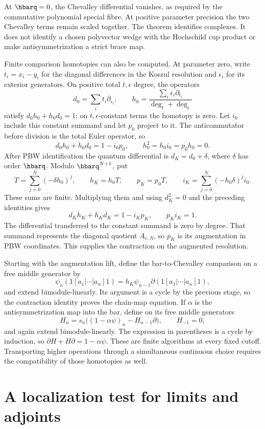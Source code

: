 At $\hbarq=0$, the Chevalley differential vanishes, as required by
the commutative polynomial special fibre. At positive parameter
precision the two Chevalley terms remain scaled together.
The theorem identifies complexes. It does not identify a chosen
polyvector wedge with the Hochschild cup product or make
antisymmetrization a strict brace map.

Finite comparison homotopies can also be computed. At parameter
zero, write $t_i=x_i-y_i$ for the diagonal differences in the
Koszul resolution and $\epsilon_i$ for its exterior generators.
On positive total $t,\epsilon$ degree, the operators
\[
 d_0=\sum_i t_i\partial_{\epsilon_i},\qquad
 h_0=\frac{\sum_i\epsilon_i\partial_{t_i}}
                    {\deg_t+\deg_\epsilon}
\]
satisfy $d_0h_0+h_0d_0=1$; on $t,\epsilon$-constant terms the
homotopy is zero. Let $i_0$ include this constant summand and let
$p_0$ project to it. The anticommutator before division is the
total Euler operator, so
\[
 d_0h_0+h_0d_0=1-i_0p_0,\qquad
 h_0^2=h_0i_0=p_0h_0=0.
\]
After PBW identification the quantum differential is
$d_K=d_0+\delta$, where $\delta$ has order $\hbarq$.
Modulo $\hbarq^{N+1}$, put
\[
 T=\sum_{j=0}^{N}(-\delta h_0)^j,\qquad
 h_K=h_0T,\qquad p_K=p_0T,\qquad
 i_K=\sum_{j=0}^{N}(-h_0\delta)^j i_0.
\]
These sums are finite. Multiplying them and using
$d_K^2=0$ and the preceding identities gives
\[
 d_Kh_K+h_Kd_K=1-i_Kp_K,\qquad p_Ki_K=1.
\]
The differential transferred to the constant summand is zero by
degree. That summand represents the diagonal quotient $A_{e,N}$,
so $p_K$ is its augmentation in PBW coordinates. This supplies
the contraction on the augmented resolution.

Starting with the augmentation lift, define the bar-to-Chevalley
comparison on a free middle generator by
\[
 \psi_n(1[a_1|\cdots|a_n]1)
   =h_K\psi_{n-1}\partial(1[a_1|\cdots|a_n]1),
\]
and extend bimodule-linearly. Its argument is a cycle by the previous
stage, so the contraction identity proves the chain-map equation.
If $\alpha$ is the antisymmetrization map into the bar, define on
its free middle generators
\[
 H_n=s_n\bigl((1-\alpha\psi)_n-H_{n-1}\partial\bigr),
 \qquad H_{-1}=0,
\]
and again extend bimodule-linearly. The expression in parentheses
is a cycle by induction, so $\partial H+H\partial=1-\alpha\psi$.
These are finite algorithms at every fixed cutoff.
Transporting higher operations through a simultaneous continuous
choice requires the compatibility of those homotopies as well.

\section{A localization test for limits and adjoints}


